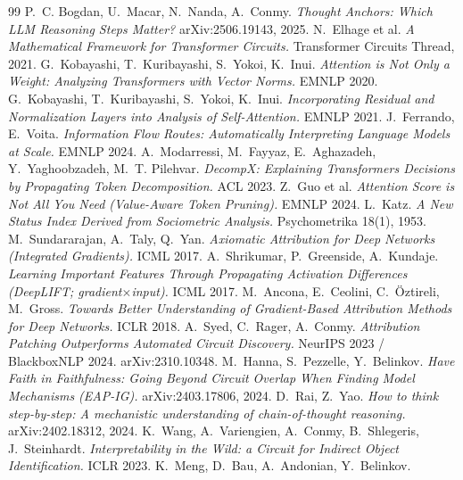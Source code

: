 \documentclass[11pt]{article}
\begin{document}
\begin{thebibliography}{99}
\small
{} P.~C. Bogdan, U.~Macar, N.~Nanda, A.~Conmy.
\emph{Thought Anchors: Which LLM Reasoning Steps Matter?} arXiv:2506.19143, 2025.
 N.~Elhage et al.
\emph{A Mathematical Framework for Transformer Circuits.} Transformer Circuits Thread, 2021.
 G.~Kobayashi, T.~Kuribayashi, S.~Yokoi, K.~Inui.
\emph{Attention is Not Only a Weight: Analyzing Transformers with Vector Norms.} EMNLP 2020.
 G.~Kobayashi, T.~Kuribayashi, S.~Yokoi, K.~Inui.
\emph{Incorporating Residual and Normalization Layers into Analysis of Self-Attention.} EMNLP 2021.
 J.~Ferrando, E.~Voita.
\emph{Information Flow Routes: Automatically Interpreting Language Models at Scale.} EMNLP 2024.
 A.~Modarressi, M.~Fayyaz, E.~Aghazadeh, Y.~Yaghoobzadeh, M.~T. Pilehvar.
\emph{DecompX: Explaining Transformers Decisions by Propagating Token Decomposition.} ACL 2023.
 Z.~Guo et al.
\emph{Attention Score is Not All You Need (Value-Aware Token Pruning).} EMNLP 2024.
 L.~Katz.
\emph{A New Status Index Derived from Sociometric Analysis.} Psychometrika 18(1), 1953.
 M.~Sundararajan, A.~Taly, Q.~Yan.
\emph{Axiomatic Attribution for Deep Networks (Integrated Gradients).} ICML 2017.
 A.~Shrikumar, P.~Greenside, A.~Kundaje.
\emph{Learning Important Features Through Propagating Activation Differences (DeepLIFT; gradient$\times$input).} ICML 2017.
 M.~Ancona, E.~Ceolini, C.~\"Oztireli, M.~Gross.
\emph{Towards Better Understanding of Gradient-Based Attribution Methods for Deep Networks.} ICLR 2018.
 A.~Syed, C.~Rager, A.~Conmy.
\emph{Attribution Patching Outperforms Automated Circuit Discovery.} NeurIPS 2023 / BlackboxNLP 2024. arXiv:2310.10348.
 M.~Hanna, S.~Pezzelle, Y.~Belinkov.
\emph{Have Faith in Faithfulness: Going Beyond Circuit Overlap When Finding Model Mechanisms (EAP-IG).} arXiv:2403.17806, 2024.
 D.~Rai, Z.~Yao.
\emph{How to think step-by-step: A mechanistic understanding of chain-of-thought reasoning.} arXiv:2402.18312, 2024.
 K.~Wang, A.~Variengien, A.~Conmy, B.~Shlegeris, J.~Steinhardt.
\emph{Interpretability in the Wild: a Circuit for Indirect Object Identification.} ICLR 2023.
 K.~Meng, D.~Bau, A.~Andonian, Y.~Belinkov.

\end{thebibliography}
\end{document}

